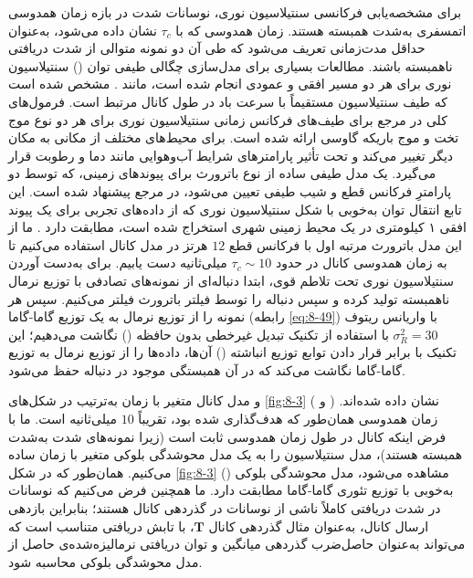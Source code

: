 برای مشخصه‌یابی فرکانسی سنتیلاسیون نوری، نوسانات شدت در بازه زمان همدوسی اتمسفری به‌شدت همبسته هستند. زمان همدوسی که با $\tau_c$ نشان داده می‌شود، به‌عنوان حداقل مدت‌زمانی تعریف می‌شود که طی آن دو نمونه متوالی از شدت دریافتی ناهمبسته باشند. مطالعات بسیاری برای مدل‌سازی چگالی طیفی توان () سنتیلاسیون نوری برای هر دو مسیر افقی و عمودی انجام شده است، مانند \cite{8-46, 8-47}. مشخص شده است که طیف سنتیلاسیون مستقیماً با سرعت باد در طول کانال مرتبط است. فرمول‌های کلی در مرجع \cite{8-45} برای طیف‌های فرکانس زمانی سنتیلاسیون نوری برای هر دو نوع موج تخت و موج باریکه گاوسی ارائه شده است.  برای محیط‌های مختلف از مکانی به مکان دیگر تغییر می‌کند و تحت تأثیر پارامترهای شرایط آب‌وهوایی مانند دما و رطوبت قرار می‌گیرد. یک مدل طیفی ساده از نوع باترورث برای پیوندهای  زمینی، که توسط دو پارامترِ فرکانس قطع و شیب طیفی تعیین می‌شود، در مرجع \cite{8-47} پیشنهاد شده است. این تابع انتقال توان به‌خوبی با شکل  سنتیلاسیون نوری که از داده‌های تجربی برای یک پیوند افقی ۱ کیلومتری در یک محیط زمینی شهری استخراج شده است، مطابقت دارد \cite{8-47}. ما از این مدل باترورث مرتبه اول با فرکانس قطع $12$ هرتز در مدل کانال  استفاده می‌کنیم تا به زمان همدوسی کانال در حدود $\tau_c \sim 10$ میلی‌ثانیه دست یابیم. برای به‌دست آوردن سنتیلاسیون نوری تحت تلاطم قوی، ابتدا دنباله‌ای از نمونه‌های تصادفی با توزیع نرمال ناهمبسته تولید کرده و سپس دنباله را توسط فیلتر باترورث فیلتر می‌کنیم. سپس هر نمونه را از توزیع نرمال به یک توزیع گاما-گاما (رابطه \eqref{eq:8-49}) با واریانس ریتوف $\sigma^2_R = 30$ با استفاده از تکنیک تبدیل غیرخطی بدون حافظه () \cite{8-48} نگاشت می‌دهیم؛ این تکنیک با برابر قرار دادن توابع توزیع انباشته () آن‌ها، داده‌ها را از توزیع نرمال به توزیع گاما-گاما نگاشت می‌کند که در آن همبستگی موجود در دنباله حفظ می‌شود.








 و  مدل کانال  متغیر با زمان به‌ترتیب در شکل‌های \ref{fig:8-3} ( و ) نشان داده شده‌اند. زمان همدوسی همان‌طور که هدف‌گذاری شده بود، تقریباً $10$ میلی‌ثانیه است. ما با فرض اینکه کانال در طول زمان همدوسی ثابت است (زیرا نمونه‌های شدت به‌شدت همبسته هستند)، مدل سنتیلاسیون را به یک مدل محوشدگی بلوکی متغیر با زمان ساده می‌کنیم. همان‌طور که در شکل \ref{fig:8-3} () مشاهده می‌شود،  مدل محوشدگی بلوکی به‌خوبی با توزیع تئوری گاما-گاما مطابقت دارد. ما همچنین فرض می‌کنیم که نوسانات در شدت دریافتی کاملاً ناشی از نوسانات در گذردهی کانال هستند؛ بنابراین بازدهی ارسال کانال، به‌عنوان مثال گذردهی کانال $\bm{T}$، با تابش دریافتی متناسب است که می‌تواند به‌عنوان حاصل‌ضرب گذردهی میانگین و توان دریافتی نرمالیزه‌شده‌ی حاصل از مدل محوشدگی بلوکی محاسبه شود.

